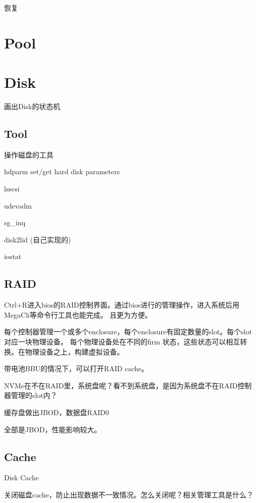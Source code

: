 恢复


\section{Pool}

\section{Disk}

画出Disk的状态机

\subsection{Tool}

操作磁盘的工具
\begin{enumbox}
\item hdparm set/get hard disk parameters
\item lsscsi
\item udevadm
\item sg\_inq
\item disk2lid (自己实现的)
\item iostat
\end{enumbox}

\subsection{RAID}

Ctrl+R进入bios的RAID控制界面。通过bios进行的管理操作，进入系统后用MegaCli等命令行工具也能完成。
且更为方便。

每个控制器管理一个或多个enclosure，每个enclosure有固定数量的slot。每个slot对应一块物理设备。
每个物理设备处在不同的firm 状态，这些状态可以相互转换。在物理设备之上，构建虚拟设备。

带电池BBU的情况下，可以打开RAID cache。

NVMe在不在RAID里，系统盘呢？看不到系统盘，是因为系统盘不在RAID控制器管理的slot内？

缓存盘做出JBOD，数据盘RAID0

全部是JBOD，性能影响较大。

\subsection{Cache}

Disk Cache

关闭磁盘cache，防止出现数据不一致情况。怎么关闭呢？相关管理工具是什么？

